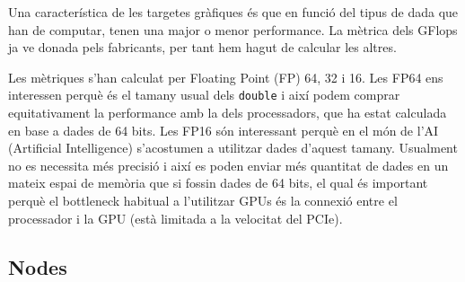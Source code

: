 Una característica de les targetes gràfiques és que en funció del tipus de dada que han de computar, tenen una major o menor performance. La mètrica dels GFlops ja ve donada pels fabricants, per tant hem hagut de calcular les altres. 

Les mètriques s'han calculat per Floating Point (FP) 64, 32 i 16.
Les FP64 ens interessen perquè és el tamany usual dels \texttt{double} i així podem comprar equitativament la performance amb la dels processadors, que ha estat calculada en base a dades de 64 bits.
Les FP16 són interessant perquè en el món de l'AI (Artificial Intelligence) s'acostumen a utilitzar dades d'aquest tamany. Usualment no es necessita més precisió i així es poden enviar més quantitat de dades en un mateix espai de memòria que si fossin dades de 64 bits, el qual és important perquè el bottleneck habitual a l'utilitzar GPUs és la connexió entre el processador i la GPU (està limitada a la velocitat del PCIe).

\subsection{Nodes}
